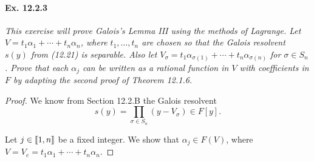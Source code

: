 \documentclass[11pt,a4paper]{article}
\def\gcro{\mbox{[\hspace{-.15em}[}}%
\def\dcro{\mbox{]\hspace{-.15em}]}}
\begin{document}
\paragraph{Ex. 12.2.3}

{\it This exercise will prove Galois's Lemma III using the methods of Lagrange. Let $V = t_1\alpha_1 + \cdots + t_n \alpha_n$, where $t_1,\ldots,t_n$ are chosen so that the Galois resolvent $s(y)$ from (12.21) is separable. Also let $V_{\sigma} = t_1 \alpha_{\sigma(1)} + \cdots + t_n \alpha_{\sigma(n)}$ for $\sigma \in S_n$. Prove that each $\alpha_j$ can be written as a rational function in $V$ with coefficients in $F$ by adapting the second proof of Theorem 12.1.6.
}

\begin{proof}
We know from Section 12.2.B the Galois resolvent
$$s(y) = \prod_{\sigma \in S_n} (y - V_\sigma) \in F[y].$$

Let $j \in \gcro 1, n\dcro$ be a fixed integer. We show that $\alpha_j \in F(V)$, where $V = V_e = t_1 \alpha_1+ \cdots + t_n \alpha_n$.


\end{proof}
\end{document}
